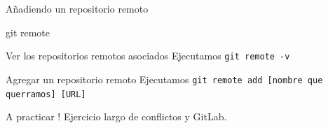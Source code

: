 \begin{frame}[t]{Añadiendo un repositorio remoto}
    \begin{comando}
        git remote
    \end{comando}

    \vspace{0.5em}
    \pause
    \begin{block}{Ver los repositorios remotos asociados}
        Ejecutamos \texttt{git remote -v}
    \end{block}

    \pause
    \begin{block}{Agregar un repositorio remoto}
        Ejecutamos \texttt{git remote add [nombre que querramos] [URL]}
    \end{block}
\end{frame}

\begin{frame}[t]{A practicar !}
    Ejercicio largo de conflictos y GitLab.

\end{frame}

